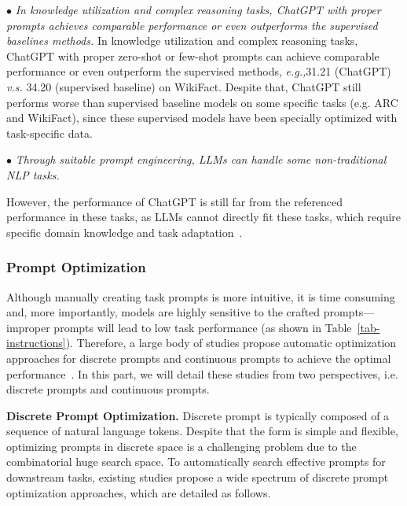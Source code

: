 {{{$\bullet$ {\emph{In knowledge utilization and complex reasoning tasks, ChatGPT with proper prompts achieves comparable performance or even outperforms the supervised baselines methods.} In knowledge utilization and  complex reasoning tasks, ChatGPT with proper zero-shot or few-shot prompts can achieve comparable performance or even outperform the supervised  methods, {\emph{e.g.,}31.21 (ChatGPT) \emph{v.s.} 34.20 (supervised baseline) on WikiFact.} Despite that, ChatGPT still performs worse than supervised baseline models on some specific tasks (e.g. ARC and WikiFact), since these supervised models have been specially optimized with task-specific data. }

$\bullet$ \emph{Through suitable prompt engineering, LLMs can handle some non-traditional NLP tasks.}  

However, the performance of ChatGPT is still far from the referenced performance in these tasks, as LLMs cannot directly fit these tasks, which require specific domain knowledge and task adaptation~\cite{Zhang-2023-arxiv-recommendation,Hou-2023-arxiv-large}.

\subsubsection{Prompt Optimization} \label{sec:prompt_opt} 

{Although manually creating task prompts is more intuitive, it is time consuming and, more importantly, models are highly sensitive to the crafted prompts---improper prompts will lead to low task performance (as shown in Table~\ref{tab-instructions}). Therefore, a large body of studies propose automatic optimization approaches for discrete prompts and continuous prompts to achieve the optimal performance~\cite{shin-EMNLP-2020-autoprompt,Li-ACL-2021-prefix}. In this part, we will detail these studies from two perspectives, i.e. discrete prompts and continuous prompts.}

\textbf{Discrete Prompt Optimization.}  {Discrete prompt is typically composed of a sequence of natural language tokens. Despite that the form is simple and flexible, optimizing prompts in discrete space is a challenging problem due to the combinatorial huge search space. To automatically search effective prompts for downstream tasks, existing studies propose a wide spectrum of discrete prompt optimization approaches, which are detailed as follows.}

}}}
